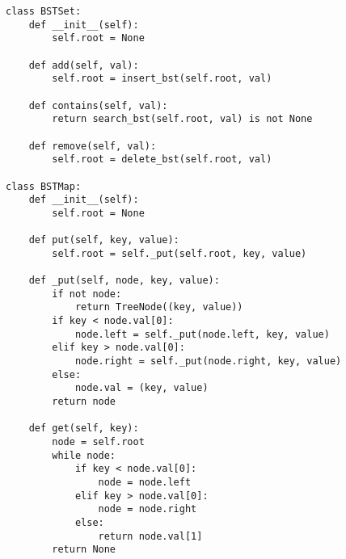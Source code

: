 \begin{algo}
\begin{lstlisting}
class BSTSet:
    def __init__(self):
        self.root = None

    def add(self, val):
        self.root = insert_bst(self.root, val)

    def contains(self, val):
        return search_bst(self.root, val) is not None

    def remove(self, val):
        self.root = delete_bst(self.root, val)

class BSTMap:
    def __init__(self):
        self.root = None

    def put(self, key, value):
        self.root = self._put(self.root, key, value)

    def _put(self, node, key, value):
        if not node:
            return TreeNode((key, value))
        if key < node.val[0]:
            node.left = self._put(node.left, key, value)
        elif key > node.val[0]:
            node.right = self._put(node.right, key, value)
        else:
            node.val = (key, value)
        return node

    def get(self, key):
        node = self.root
        while node:
            if key < node.val[0]:
                node = node.left
            elif key > node.val[0]:
                node = node.right
            else:
                return node.val[1]
        return None
\end{lstlisting}
\end{algo}